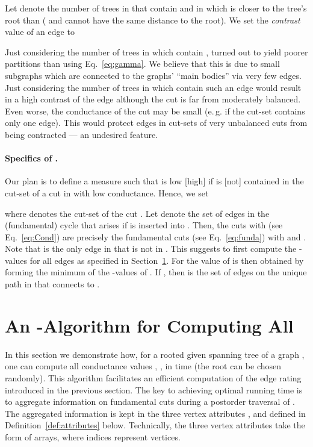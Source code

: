 \documentclass[pdftex]{llncs}
\newcommand{\eg}{e.\,g.\xspace}
\numberwithin{equation}{section}
\numberwithin{example}{section}
\numberwithin{table}{section}
\begin{document}
Let  denote the number of trees in
 that contain  and in which  is closer to the
tree's root than  ( and  cannot have the same distance to the
root). We set the {\em contrast} value of an edge  to



Just considering the number of trees in  which contain
, turned out to yield poorer partitions than using
Eq.~\ref{eq:gamma}. We believe that this is due to small subgraphs
which are connected to the graphs' ``main bodies'' via very few
edges. Just considering the number of trees in  which
contain such an edge would result in a high contrast of the edge
although the cut is far from moderately balanced. Even worse, the
conductance of the cut may be small (\eg if the cut-set contains only
one edge). This would protect edges in cut-sets of very unbalanced
cuts from being contracted --- an undesired feature.

\paragraph{Specifics of .}
Our plan is to define a measure  such that  is
low [high] if  is [not] contained in the cut-set of a cut in
 with low conductance. Hence, we set



\noindent where  denotes the cut-set of the cut . Let 
denote the set of edges in the (fundamental) cycle that arises if 
is inserted into . Then, the cuts  with  (see Eq.~\ref{eq:Cond}) are precisely the fundamental cuts
 (see Eq.~\ref{eq:funda}) with  and . Note that  is the only edge in  that is not in
. This suggests to first compute the -values for all
edges  as specified in Section~\ref{sec:effCond}.  For
 the value of  is then obtained by forming
the minimum of the -values of . If , then  is the set of edges on the
unique path in  that connects  to .





\section{An -Algorithm for Computing All
   }
\label{sec:effCond}
In this section we demonstrate how, for a rooted given spanning tree
 of a graph , one can compute all conductance values
, , in time  (the
root can be chosen randomly). This algorithm facilitates an efficient
computation of the edge rating introduced in the previous section.
The key to achieving optimal running time is to aggregate information
on fundamental cuts during a postorder traversal of . The
aggregated information is kept in the three vertex attributes
,  and  defined in
Definition~\ref{def:attributes} below.
Technically, the three vertex attributes take the form
of arrays, where indices represent vertices.
\end{document}
